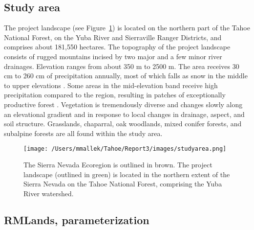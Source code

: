 \documentclass[12pt]{article}
\begin{document}
\begin{spacing}{1}
\subsection*{Study area}
The project landscape (see Figure~\ref{projectarea}) is located on the northern part of the Tahoe National Forest, on the Yuba River and Sierraville Ranger Districts, and comprises about 181,550 hectares. The topography of the project landscape consists of rugged mountains incised by two major and a few minor river drainages. Elevation ranges from about 350 m to 2500 m. The area receives 30 cm to 260 cm of precipitation annually, most of which falls as snow in the middle to upper elevations \citep{Storer1963}. Some areas in the mid-elevation band receive high precipitation compared to the region, resulting in patches of exceptionally productive forest \citep{Littell2012}. Vegetation is tremendously diverse and changes slowly along an elevational gradient and in response to local changes in drainage, aspect, and soil structure. Grasslands, chaparral, oak woodlands, mixed conifer forests, and subalpine forests are all found within the study area. 

\begin{figure}
\centering
\texttt{[image: /Users/mmallek/Tahoe/Report3/images/studyarea.png]}
\caption{The Sierra Nevada Ecoregion is outlined in brown. The project landscape (outlined in green) is located in the northern extent of the Sierra Nevada on the Tahoe National Forest, comprising the Yuba River watershed.}
\label{projectarea}
\end{figure}


\subsection*{RMLands, parameterization}


\end{spacing}
\end{document}
